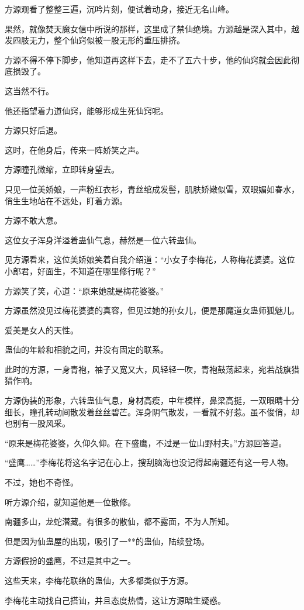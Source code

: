 \begin{this_body}
方源观看了整整三遍，沉吟片刻，便试着动身，接近无名山峰。

果然，就像焚天魔女信中所说的那样，这里成了禁仙绝境。方源越是深入其中，越发四肢无力，整个仙窍似被一股无形的重压排挤。

方源不得不停下脚步，他知道再这样下去，走不了五六十步，他的仙窍就会因此彻底损毁了。

这当然不行。

他还指望着力道仙窍，能够形成生死仙窍呢。

方源只好后退。

这时，在他身后，传来一阵娇笑之声。

方源瞳孔微缩，立即转身望去。

只见一位美娇娘，一声粉红衣衫，青丝绾成发髻，肌肤娇嫩似雪，双眼媚如春水，俏生生地站在不远处，盯着方源。

方源不敢大意。

这位女子浑身洋溢着蛊仙气息，赫然是一位六转蛊仙。

见方源看来，这位美娇娘笑着自我介绍道：“小女子李梅花，人称梅花婆婆。这位小郎君，好面生，不知道在哪里修行呢？”

方源笑了笑，心道：“原来她就是梅花婆婆。”

方源虽然没见过梅花婆婆的真容，但见过她的孙女儿，便是那魔道女蛊师狐魅儿。

爱美是女人的天性。

蛊仙的年龄和相貌之间，并没有固定的联系。

此时的方源，一身青袍，袖子又宽又大，风轻轻一吹，青袍鼓荡起来，宛若战旗猎猎作响。

方源伪装的形象，六转蛊仙气息，身材高瘦，中年模样，鼻梁高挺，一双眼睛十分细长，瞳孔转动间散发着丝丝碧芒。浑身阴气散发，一看就不好惹。虽不俊俏，却也别有一股风采。

“原来是梅花婆婆，久仰久仰。在下盛鹰，不过是一位山野村夫。”方源回答道。

“盛鹰……”李梅花将这名字记在心上，搜刮脑海也没记得起南疆还有这一号人物。

不过，她也不奇怪。

听方源介绍，就知道他是一位散修。

南疆多山，龙蛇潜藏。有很多的散仙，都不露面，不为人所知。

但是因为仙蛊屋的出现，吸引了一**的蛊仙，陆续登场。

方源假扮的盛鹰，不过是其中之一。

这些天来，李梅花联络的蛊仙，大多都类似于方源。

李梅花主动找自己搭讪，并且态度热情，这让方源暗生疑惑。


\end{this_body}
